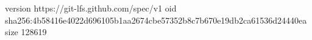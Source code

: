 version https://git-lfs.github.com/spec/v1
oid sha256:4b58416e4022d696105b1aa2674cbe57352b8c7b670e19db2ca61536d24440ea
size 128619
